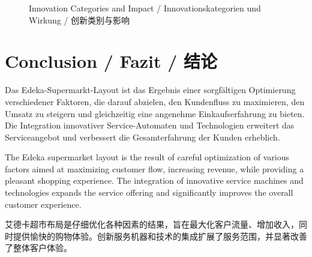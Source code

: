 \begin{figure}[h]
\caption{Innovation Categories and Impact / Innovationskategorien und Wirkung / 创新类别与影响}
\end{figure}

\section{Conclusion / Fazit / 结论}

\begin{otherlanguage}{ngerman}
Das Edeka-Supermarkt-Layout ist das Ergebnis einer sorgfältigen Optimierung verschiedener Faktoren, die darauf abzielen, den Kundenfluss zu maximieren, den Umsatz zu steigern und gleichzeitig eine angenehme Einkaufserfahrung zu bieten. Die Integration innovativer Service-Automaten und Technologien erweitert das Serviceangebot und verbessert die Gesamterfahrung der Kunden erheblich.
\end{otherlanguage}

The Edeka supermarket layout is the result of careful optimization of various factors aimed at maximizing customer flow, increasing revenue, while providing a pleasant shopping experience. The integration of innovative service machines and technologies expands the service offering and significantly improves the overall customer experience.

艾德卡超市布局是仔细优化各种因素的结果，旨在最大化客户流量、增加收入，同时提供愉快的购物体验。创新服务机器和技术的集成扩展了服务范围，并显著改善了整体客户体验。
